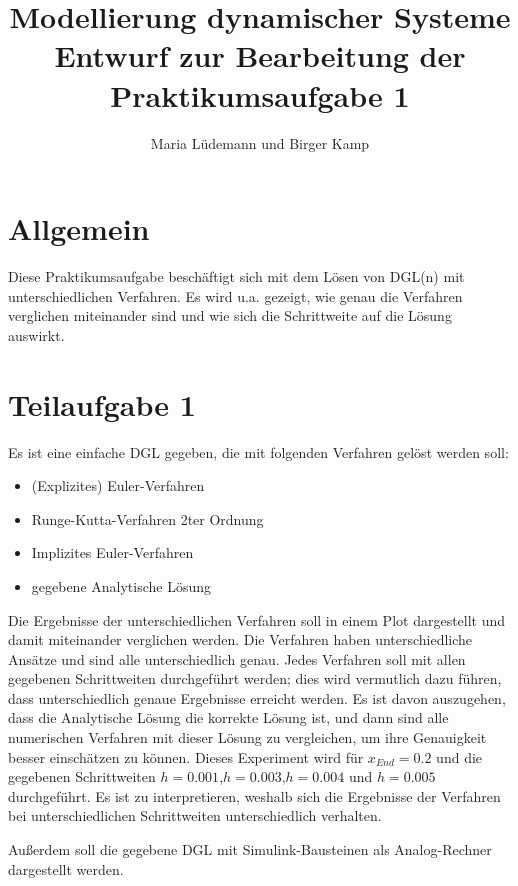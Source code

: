 \documentclass[]{scrartcl}
\title{Modellierung dynamischer Systeme  \\ Entwurf zur Bearbeitung der Praktikumsaufgabe 1}
\author{Maria Lüdemann und Birger Kamp}
\begin{document}
\maketitle

\begin{abstract}

\end{abstract}

\section{Allgemein}
Diese Praktikumsaufgabe beschäftigt sich mit dem Lösen von DGL(n) mit unterschiedlichen Verfahren. Es wird u.a. gezeigt, wie genau die Verfahren verglichen miteinander sind und wie sich die Schrittweite auf die Lösung auswirkt.

\section{Teilaufgabe 1}
Es ist eine einfache DGL gegeben, die mit folgenden Verfahren gelöst werden soll:

\begin{itemize}
	\item (Explizites) Euler-Verfahren
	\item Runge-Kutta-Verfahren 2ter Ordnung
	\item Implizites Euler-Verfahren
	\item gegebene Analytische Lösung
\end{itemize}

Die Ergebnisse der unterschiedlichen Verfahren soll in einem Plot dargestellt und damit miteinander verglichen werden. Die Verfahren haben unterschiedliche Ansätze und sind alle unterschiedlich genau. Jedes Verfahren soll mit allen gegebenen Schrittweiten durchgeführt werden; dies wird vermutlich dazu führen, dass unterschiedlich genaue Ergebnisse erreicht werden. Es ist davon auszugehen, dass die Analytische Lösung die korrekte Lösung ist, und dann sind alle numerischen Verfahren mit dieser Lösung zu vergleichen, um ihre Genauigkeit besser einschätzen zu können. Dieses Experiment wird für $x_{End} = 0.2$ und die gegebenen Schrittweiten $h=0.001$,$h=0.003$,$h=0.004$  und $h=0.005$ durchgeführt. Es ist zu interpretieren, weshalb sich die Ergebnisse der Verfahren bei unterschiedlichen Schrittweiten unterschiedlich verhalten.

Außerdem soll die gegebene DGL mit Simulink-Bausteinen als Analog-Rechner dargestellt werden.
\end{document}
